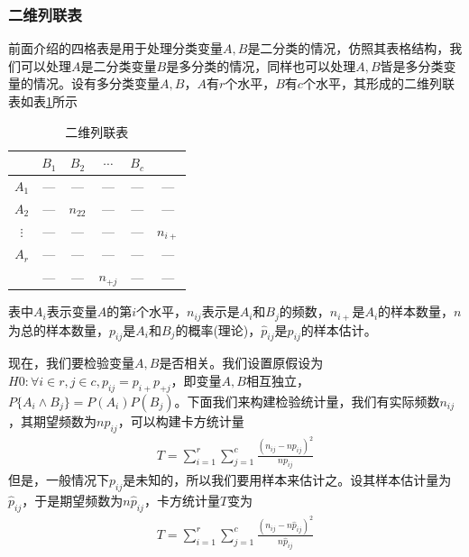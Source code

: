         \subsubsection{二维列联表}
            \par
            前面介绍的四格表是用于处理分类变量$A,B$是二分类的情况，仿照其表格结构，我们可以处理$A$是二分类变量$B$是多分类的情况，同样也可以处理$A,B$皆是多分类变量的情况。设有多分类变量$A,B$，$A$有$r$个水平，$B$有$c$个水平，其形成的二维列联表如表\ref{tab:二维列联表}所示
            \begin{table}[H]
            \caption{二维列联表}
            \label{tab:二维列联表}
            \centering
            \begin {tabular}{c|cccc|c}
            {}& $B_1$& $B_2$ & $\cdots$ &$B_c$ & {}\\
            \hline
            $A_1$& — &  —  & — & — & — \\
            $A_2$& — & $n_{22}$ & — & —&  — \\
            $\vdots $& — &  —  & — & — &$n_{i+}$\\
            $A_r$& — &  —  & — & — & — \\
            \hline
            {}& — &  —  & $n_{+j}$ & — & — \\
            \end{tabular}
            \end{table}
            表中$A_i$表示变量$A$的第$i$个水平，$n_{ij}$表示是$A_i$和$B_j$的频数，$n_{i+}$是$A_i$的样本数量，$n$为总的样本数量，$p_{ij}$是$A_i$和$B_j$的概率(理论)，$\hat{p}_{ij}$是$p_{ij}$的样本估计。
            \par
            现在，我们要检验变量$A,B$是否相关。我们设置原假设为$H0:\forall i\in r,j\in c,p_{ij} = p_{i+}p_{+j}$，即变量$A,B$相互独立，$P\{A_i \wedge  B_j\} = P(A_i)P(B_j)$。下面我们来构建检验统计量，我们有实际频数$n_{ij}$，其期望频数为$n{p}_{ij}$，可以构建卡方统计量
            \begin{align*}
            T = \sum_{i=1}^r\sum_{j=1}^c \frac{(n_{ij} - np_{ij})^2}{np_{ij}}
            \end{align*}
            但是，一般情况下$p_{ij}$是未知的，所以我们要用样本来估计之。设其样本估计量为$\hat{p}_{ij}$，于是期望频数为$n\hat{p}_{ij}$，卡方统计量$T$变为
            \begin{align*}
            T = \sum_{i=1}^r\sum_{j=1}^c \frac{(n_{ij} - n\hat{p}_{ij})^2}{n\hat{p}_{ij}}
            \end{align*}
